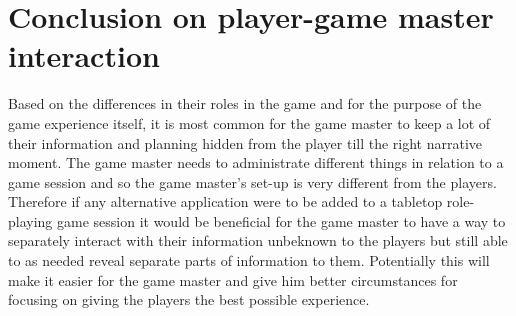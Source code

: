 \section*{Conclusion on player-game master interaction}
Based on the differences in their roles in the game and for the purpose of the game experience itself, it is most common for the game master to keep a lot of their information and planning hidden from the player till the right narrative moment. The game master needs to administrate different things in relation to a game session and so the game master's set-up is very different from the players. Therefore if any alternative application were to be added to a tabletop role-playing game session it would be beneficial for the game master to have a way to separately interact with their information unbeknown to the players but still able to as needed reveal separate parts of information to them. Potentially this will make it easier for the game master and give him better circumstances for focusing on giving the players the best possible experience.
